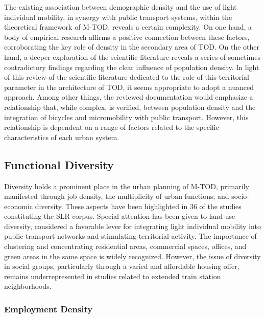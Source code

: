 \begin{refsegment}
The existing association between demographic density and the use of light individual mobility, in synergy with public transport systems, within the theoretical framework of \acrshort{M-TOD}, reveals a certain complexity. On one hand, a body of empirical research affirms a positive connection between these factors, corroborating the key role of density in the secondary area of \acrshort{TOD}. On the other hand, a deeper exploration of the scientific literature reveals a series of sometimes contradictory findings regarding the clear influence of population density. In light of this review of the scientific literature dedicated to the role of this territorial parameter in the architecture of \acrshort{TOD}, it seems appropriate to adopt a nuanced approach. Among other things, the reviewed documentation would emphasize a relationship that, while complex, is verified, between population density and the integration of bicycles and micromobility with public transport. However, this relationship is dependent on a range of factors related to the specific characteristics of each urban system.%

\subsection{Functional Diversity
    \label{chap2:diversite-fonctionnelle}
    }

Diversity holds a prominent place in the urban planning of \acrshort{M-TOD}, primarily manifested through job density, the multiplicity of urban functions, and socio-economic diversity. These aspects have been highlighted in 36 of the studies constituting the \acrshort{SLR} corpus. Special attention has been given to land-use diversity, considered a favorable lever for integrating light individual mobility into public transport networks and stimulating territorial activity. The importance of clustering and concentrating residential areas, commercial spaces, offices, and green areas in the same space is widely recognized. However, the issue of diversity in social groups, particularly through a varied and affordable housing offer, remains underrepresented in studies related to extended train station neighborhoods.%

\subsubsection*{Employment Density
    \label{chap2:densite-emplois}
    }


\end{refsegment}

